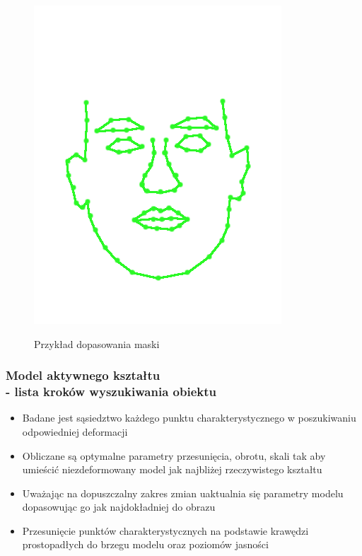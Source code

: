 \documentclass[xcolor=table]{beamer}
\begin{document}
\begin{frame}
\begin{center}
\begin{figure}
     {\includegraphics[scale=0.4]{aktywny1.png}}
    \caption{Przykład dopasowania maski}
  \end{figure}
\end{center}
\end{frame}

\begin{frame}
  \frametitle{Model aktywnego kształtu \\ - lista kroków wyszukiwania obiektu}
  \begin{itemize}
\item Badane jest sąsiedztwo każdego punktu charakterystycznego w poszukiwaniu odpowiedniej deformacji
\item Obliczane są optymalne parametry przesunięcia, obrotu, skali tak aby umieścić niezdeformowany model jak najbliżej rzeczywistego kształtu
\item Uważając na dopuszczalny zakres zmian uaktualnia się parametry modelu dopasowując go jak najdokładniej do obrazu
\item Przesunięcie punktów charakterystycznych na podstawie krawędzi prostopadłych do brzegu modelu oraz poziomów jasności
\end{itemize}
\end{frame}
\end{document}
